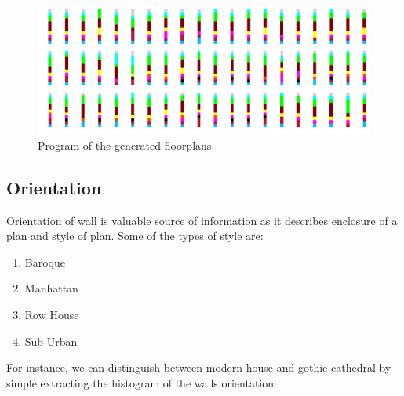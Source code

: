                         \begin{figure}[h]
                                \centering
                                \includegraphics[width=1\textwidth]{img/chapter_6/program.png}
                                \caption{Program of the generated floorplans}
                                \label{fig: Program of the generated floor plans}
                        \end{figure}
                \pagebreak
                \subsection{Orientation}
                        Orientation of wall is valuable source of information as it describes enclosure of a plan and style of plan. Some of the types of style are:
                        \begin{enumerate}[label=\alph*.]
                                \item Baroque
                                \item Manhattan
                                \item Row House 
                                \item Sub Urban
                        \end{enumerate}
                        For instance, we can distinguish between modern house and gothic cathedral by simple extracting the histogram of the walls orientation.
